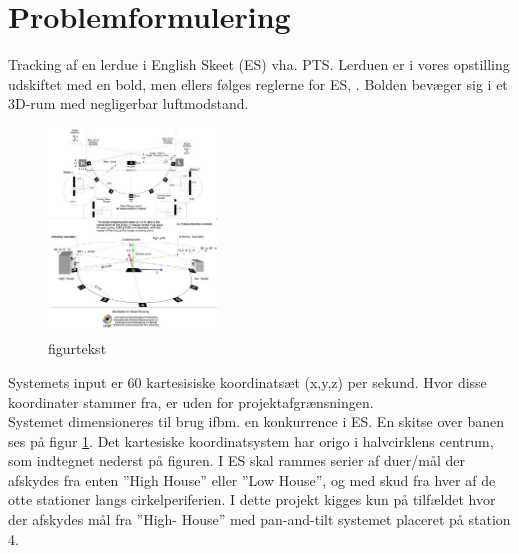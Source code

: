 \section{Problemformulering}
Tracking af en lerdue i English Skeet (ES) vha. PTS. 
Lerduen er i vores opstilling udskiftet med en bold, men ellers følges reglerne for ES, \citep{ES_regler}.
Bolden bevæger sig i et 3D-rum med negligerbar luftmodstand. \\

\begin{figure}[th!]
\centering
\includegraphics[width=0.4\textwidth]{./graphics/skeet-diagram_med_akser}
\caption[tekst i indholdsfortegnelsen]{figurtekst}
\label{fig:ES}
\end{figure}	
Systemets input er 60 kartesisiske koordinatsæt (x,y,z) per sekund. Hvor disse 
koordinater stammer fra, er uden for projektafgrænsningen. \\

Systemet dimensioneres til brug ifbm. en konkurrence i ES. En skitse over 
banen ses på figur \ref{fig:ES}. Det kartesiske koordinatsystem har origo i halvcirklens centrum, 
som indtegnet 
nederst på figuren. I ES skal rammes serier af duer/mål der afskydes fra 
enten ”High House” eller ”Low House”, og med skud fra hver af de otte stationer langs 
cirkelperiferien. I dette projekt kigges kun på tilfældet hvor der afskydes mål fra ”High-
House” med pan-and-tilt systemet placeret på station 4.\\

